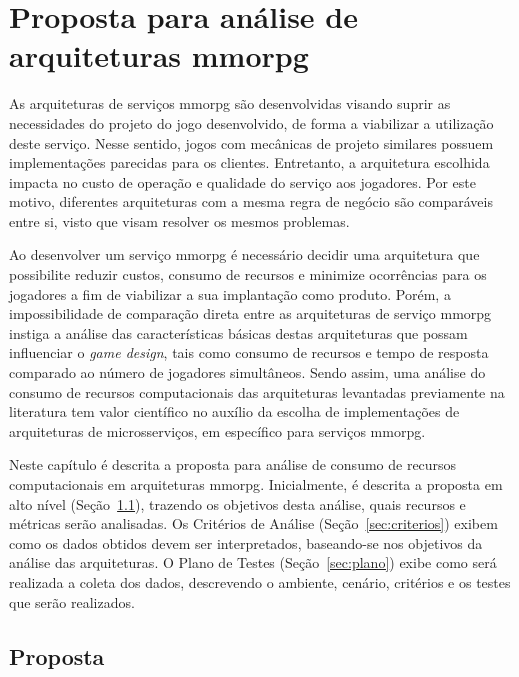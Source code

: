 \chapter{Proposta para análise de arquiteturas \ac{mmorpg}}
\label{cap3}


As arquiteturas de serviços \ac{mmorpg} são desenvolvidas visando suprir as necessidades do projeto do jogo desenvolvido, de forma a viabilizar a utilização deste serviço.
%
Nesse sentido, jogos com mecânicas de projeto similares possuem implementações parecidas para os clientes.
%
Entretanto, a arquitetura escolhida impacta no custo de operação e qualidade do serviço aos jogadores.
%
Por este motivo, diferentes arquiteturas com a mesma regra de negócio são comparáveis entre si, visto que visam resolver os mesmos problemas.



Ao desenvolver um serviço \ac{mmorpg} é necessário decidir uma arquitetura que possibilite reduzir custos, consumo de recursos e minimize ocorrências para os jogadores a fim de viabilizar a sua implantação como produto.
%
Porém, a impossibilidade de comparação direta entre as arquiteturas de serviço \ac{mmorpg} instiga a análise das características básicas destas arquiteturas que possam influenciar o \textit{game design}, tais como consumo de recursos e tempo de resposta comparado ao número de jogadores simultâneos.
%
Sendo assim, uma análise do consumo de recursos computacionais das arquiteturas levantadas previamente na literatura tem valor científico no auxílio da escolha de implementações de arquiteturas de microsserviços, em específico para serviços \ac{mmorpg}.



Neste capítulo é descrita a proposta para análise de consumo de recursos computacionais em arquiteturas \ac{mmorpg}.
%
Inicialmente, é descrita a proposta em alto nível (Seção~\ref{sec:proposta}), trazendo os objetivos desta análise, quais recursos e métricas serão analisadas.
%
Os Critérios de Análise (Seção~\ref{sec:criterios}) exibem como os dados obtidos devem ser interpretados, baseando-se nos objetivos da análise das arquiteturas.
%
O Plano de Testes (Seção~\ref{sec:plano}) exibe como será realizada a coleta dos dados, descrevendo o ambiente, cenário, critérios e os testes que serão realizados.

\section{Proposta}
\label{sec:proposta}

